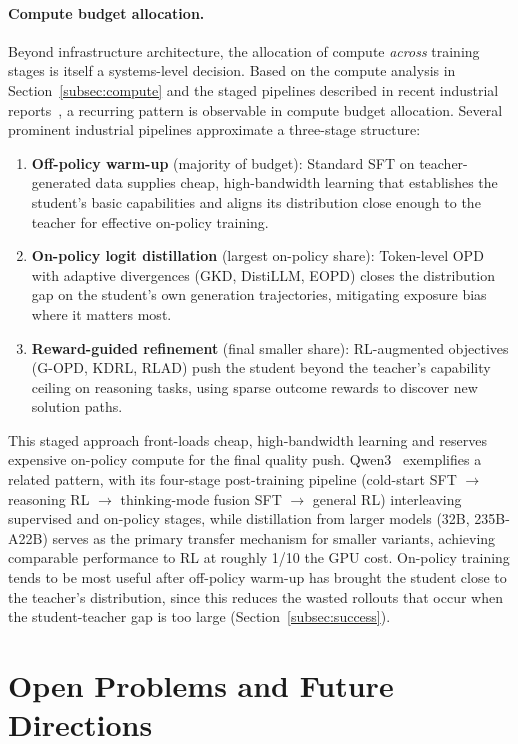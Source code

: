\documentclass{article} %
\begin{document}
\paragraph{Compute budget allocation.}
\label{subsec:budget}
Beyond infrastructure architecture, the allocation of compute \emph{across} training stages is itself a systems-level decision. Based on the compute analysis in Section~\ref{subsec:compute} and the staged pipelines described in recent industrial reports~\citep{2501.12948,2505.09388}, a recurring pattern is observable in compute budget allocation. Several prominent industrial pipelines approximate a three-stage structure:
\begin{enumerate}
    \item \textbf{Off-policy warm-up} (majority of budget): Standard SFT on teacher-generated data supplies cheap, high-bandwidth learning that establishes the student's basic capabilities and aligns its distribution close enough to the teacher for effective on-policy training.
    \item \textbf{On-policy logit distillation} (largest on-policy share): Token-level OPD with adaptive divergences (GKD, DistiLLM, EOPD) closes the distribution gap on the student's own generation trajectories, mitigating exposure bias where it matters most.
    \item \textbf{Reward-guided refinement} (final smaller share): RL-augmented objectives (G-OPD, KDRL, RLAD) push the student beyond the teacher's capability ceiling on reasoning tasks, using sparse outcome rewards to discover new solution paths.
\end{enumerate}
This staged approach front-loads cheap, high-bandwidth learning and reserves expensive on-policy compute for the final quality push. Qwen3~\citep{2505.09388} exemplifies a related pattern, with its four-stage post-training pipeline (cold-start SFT $\to$ reasoning RL $\to$ thinking-mode fusion SFT $\to$ general RL) interleaving supervised and on-policy stages, while distillation from larger models (32B, 235B-A22B) serves as the primary transfer mechanism for smaller variants, achieving comparable performance to RL at roughly 1/10 the GPU cost. On-policy training tends to be most useful after off-policy warm-up has brought the student close to the teacher's distribution, since this reduces the wasted rollouts that occur when the student-teacher gap is too large (Section~\ref{subsec:success}).

\section{Open Problems and Future Directions}
\label{sec:future}
\end{document}
